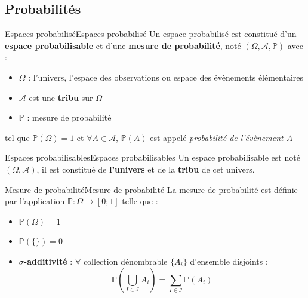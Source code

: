 \subsection{Probabilités}
\begin{definition}{Espaces probabilisé}{Espaces probabilisé}
    Un espace probabilisé est constitué d'un \textbf{espace probabilisable} et d'une \textbf{mesure de probabilité}, noté $(\Omega, \mathcal{A}, \mathbb{P})$ avec : \newline
    \begin{itemize}
        \item $\Omega$ : l'univers, l'espace des observations ou espace des évènements élémentaires
        \item $\mathcal{A}$ est une \textbf{tribu} sur $\Omega$
        \item $\mathbb{P}$ : mesure de probabilité \newline
    \end{itemize}
    \noindent tel que $\mathbb{P}(\Omega)=1$ et $\forall A \in \mathcal{A}$, $\mathbb{P}(A)$ est appelé \textit{probabilité de l'évènement $A$}
\end{definition}
\begin{definition}{Espaces probabilisables}{Espaces probabilisables}
    Un espace probabilisable est noté $(\Omega, \mathcal{A})$, il est constitué de \textbf{l'univers} et de la \textbf{tribu} de cet univers.
\end{definition}
\begin{definition}{Mesure de probabilité}{Mesure de probabilité}
   La mesure de probabilité est définie par l'application $\mathbb{P} : \Omega \longrightarrow [0;1]$ telle que :
   \begin{itemize}
    \item $\mathbb{P}(\Omega) = 1$ 
    \item $\mathbb{P}(\{\}) = 0$
    \item \textbf{$\sigma$-additivité} : $\forall $ collection dénombrable $\{ A_{i} \}$ d'ensemble disjoints :
    \begin{equation}
        \mathbb{P}(\bigcup_{I \in \mathcal{I}} A_i) = \sum_{I \in \mathcal{I}} \mathbb{P}(A_{i})
    \end{equation}
   \end{itemize}
\end{definition}

